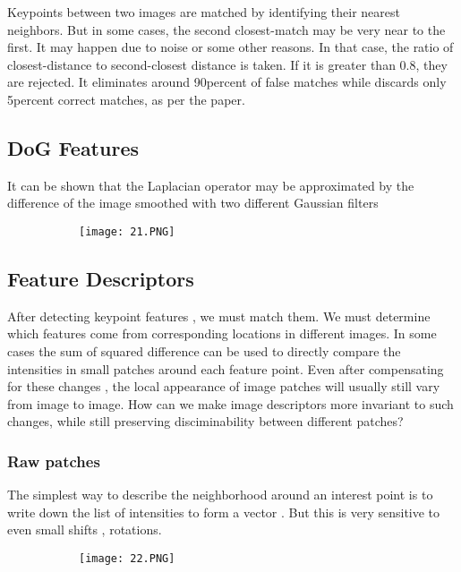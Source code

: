 \documentclass{article}
\begin{document}
Keypoints between two images are matched by identifying their nearest neighbors. But in some cases, the second closest-match may be very near to the first. It may happen due to noise or some other reasons. In that case, the ratio of closest-distance to second-closest distance is taken. If it is greater than 0.8, they are rejected. It eliminates around 90percent of false matches while discards only 5percent correct matches, as per the paper.



\subsection{DoG Features}


It can be shown that the Laplacian operator may be approximated by the difference of the image smoothed with two different Gaussian filters

\begin{figure}[ht!]
  \centering
  \begin{subfigure}[b]{0.6\linewidth}
    \texttt{[image: 21.PNG]}
  \end{subfigure}
\end{figure}

\subsection{Feature Descriptors}

After detecting keypoint features , we must match them. We must determine which features come from corresponding locations in different images. In some cases the sum of squared difference can be used to directly compare the intensities in small patches around each feature point.
Even after compensating for these changes , the local appearance of image patches will usually still vary from image to image. How can we make image descriptors more invariant to such changes, while still preserving disciminability between different patches?

\subsubsection{Raw patches}

The simplest way to describe the neighborhood around an interest point is to write down the list of intensities to form a vector . But this is very sensitive to even small shifts , rotations.

\begin{figure}[ht!]
  \centering
  \begin{subfigure}[b]{0.3\linewidth}
    \texttt{[image: 22.PNG]}
  \end{subfigure}
\end{figure}
\end{document}
